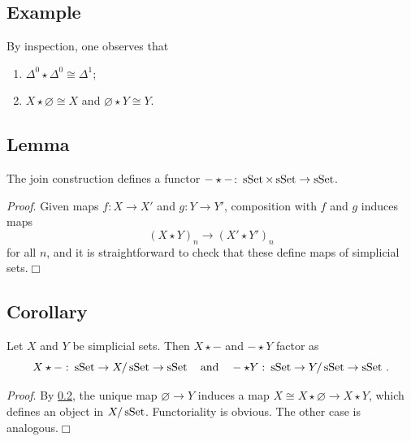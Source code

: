     \subsection{Example}\label{chVI-3-6}
        By inspection, one observes that
        \begin{enumerate}[label=\arabic*)]
            \item 
                $\Delta^0 \star \Delta^0 \cong \Delta^1$;
            \item 
                $X \star \varnothing \cong X$ and $\varnothing \star Y \cong Y$.
        \end{enumerate}

    \subsection{Lemma}\label{chVI-3-7}
        The join construction defines a functor $- \star - \colon \operatorname{sSet} \times \operatorname{sSet} \to \operatorname{sSet}$.
        \smallskip

        \emph{Proof}. Given maps $f \colon X \to X'$ and $g \colon Y \to Y'$, composition with $f$ and $g$ induces maps
        \begin{equation*}
            (X \star Y)_n \to (X' \star Y')_n
        \end{equation*}
        for all $n$, and it is straightforward to check that these define maps of simplicial sets.\hfill$\Box$

    \subsection{Corollary}\label{chVI-3-8}
        Let $X$ and $Y$ be simplicial sets. Then $X \star -$ and $- \star Y$ factor as
        \begin{equation*}
            X \star - \,\colon \operatorname{sSet} \to X / \operatorname{sSet} \to \operatorname{sSet} \quad \text{and} \quad - \star Y \,\colon \operatorname{sSet} \to Y / \operatorname{sSet} \to \operatorname{sSet} \,.
        \end{equation*}

        \emph{Proof}. By \ref{chVI-3-7}, the unique map $\varnothing \to Y$ induces a map $X \cong X \star \varnothing \to X \star Y$, which defines an object in $X / \operatorname{sSet}$. Functoriality is obvious. The other case is analogous.\hfill$\Box$

